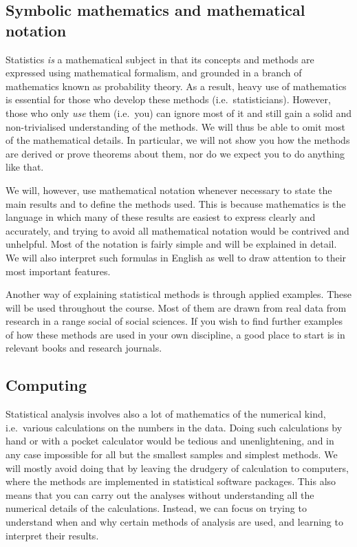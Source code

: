 \subsection{Symbolic mathematics and mathematical notation}

Statistics \emph{is} a mathematical subject in that its concepts and
methods are expressed using mathematical formalism, and
grounded in a branch of mathematics known as probability theory. As a
result, heavy use of mathematics is essential for those who develop
these methods (i.e.\ statisticians). However, those who only \emph{use}
them (i.e.\ you) can ignore most of it and still gain a solid and
non-trivialised understanding of the methods. We will thus be able to
omit most of the mathematical details. In particular, we will not show
you how the methods are derived or prove theorems about them, nor do we
expect you to do anything like that.

We will, however, use mathematical notation whenever necessary to state
the main results and to define the methods used. This is because
mathematics is the language in which many of these results are easiest
to express clearly and accurately, and trying to avoid all mathematical
notation would be contrived and unhelpful. Most of the notation is
fairly simple and will be explained in detail. We will also interpret
such formulas in English as well to draw attention to their most
important features.

Another way of explaining statistical methods is through applied
examples. These will be used throughout the course. Most of them are
drawn from real data from research in a range social of social sciences.
If you wish to find further examples of how these methods are used in
your own discipline, a good place to start is in relevant books and
research journals.

\subsection{Computing}

Statistical analysis involves also a lot of mathematics of the numerical
kind, i.e.\ various calculations on the numbers in the data. Doing such
calculations by hand or with a pocket calculator would be tedious and
unenlightening, and in any case impossible for all but the smallest
samples and simplest methods. We will mostly avoid doing that by leaving
the drudgery of calculation to computers, where the methods are
implemented in statistical software packages. This also means that you
can carry out the analyses without understanding all the numerical
details of the calculations. Instead, we can focus on trying to
understand when and why certain methods of analysis are used, and
learning to interpret their results.

